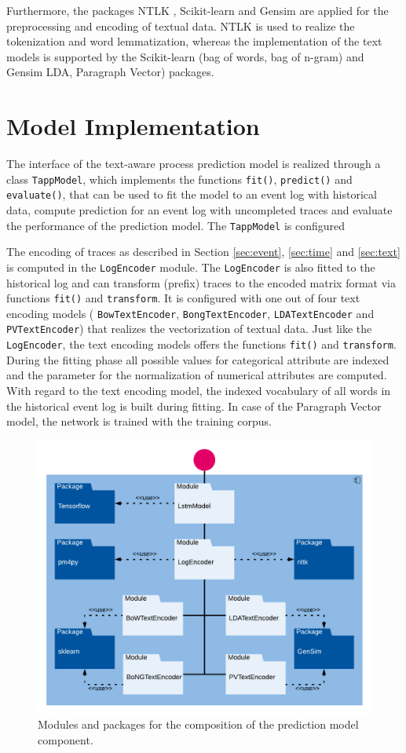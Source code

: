 Furthermore, the packages NTLK \cite{DBLP:books/daglib/0022921}, Scikit-learn \cite{DBLP:journals/jmlr/PedregosaVGMTGBPWDVPCBPD11} and Gensim \cite{rehurek_lrec} are applied for the preprocessing and encoding of textual data.
NTLK is used to realize the tokenization and word lemmatization, whereas the implementation of the text models is supported by the Scikit-learn (bag of words, bag of n-gram) and Gensim LDA, Paragraph Vector) packages.


\section{Model Implementation}

The interface of the text-aware process prediction model is realized through a class \texttt{TappModel}, which implements the functions \texttt{fit()},  \texttt{predict()} and  \texttt{evaluate()}, that can be used to fit the model to an event log with historical data, compute prediction for an event log with uncompleted traces and evaluate the performance of the prediction model.
The \texttt{TappModel} is configured 

The encoding of traces as described in Section \ref{sec:event}, \ref{sec:time} and \ref{sec:text} is computed in the \texttt{LogEncoder} module.
The \texttt{LogEncoder} is also fitted to the historical log and can transform (prefix) traces to the encoded matrix format via functions \texttt{fit()} and \texttt{transform}.
It is configured with one out of four text encoding models ( \texttt{BowTextEncoder},  \texttt{BongTextEncoder},  \texttt{LDATextEncoder} and  \texttt{PVTextEncoder}) that realizes the vectorization of textual data.
Just like the \texttt{LogEncoder}, the text encoding models offers the functions \texttt{fit()} and \texttt{transform}.
During the fitting phase all possible values for categorical attribute are indexed and the parameter for the normalization of numerical attributes are computed.
With regard to the text encoding model, the indexed vocabulary of all words in the historical event log is built during fitting.
In case of the Paragraph Vector model, the network is trained with the training corpus.



\begin{figure}[htbp!]
	\centering
	\includegraphics[width=\textwidth]{figures/implementation}
	\caption[Composition of the prediction model]{Modules and packages for the composition of the prediction model component.}
	\label{fig:/implementation}
\end{figure}